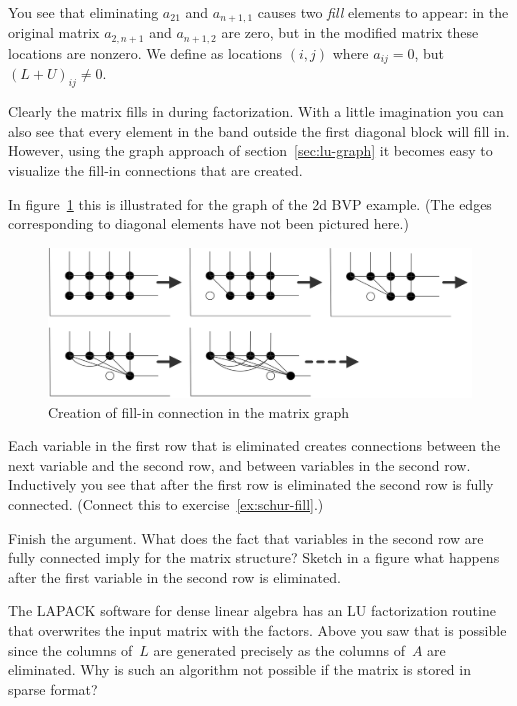 You see that eliminating $a_{21}$ and $a_{n+1,1}$ causes two
\emph{fill} elements to appear: in the original matrix $a_{2,n+1}$ and
$a_{n+1,2}$ are zero, but in the modified matrix these locations
are nonzero.  We define  as
locations $(i,j)$ where $a_{ij}=0$, but~$(L+U)_{ij}\not=0$.

Clearly the matrix fills in during factorization. With a
little imagination you can also see that every element in the band
outside the first diagonal block will fill in. However, using the
graph approach of section~\ref{sec:lu-graph} it becomes easy to
visualize the fill-in connections that are created.

In figure~\ref{fig:row-eliminate} this is illustrated for the 
graph of the 2d \ac{BVP} example. (The edges corresponding to diagonal
elements have not been pictured here.)
\begin{figure}
  \includegraphics[scale=.2]{graphics-public/row-eliminate}
  \caption{Creation of fill-in connection in the matrix graph}
  \label{fig:row-eliminate}
\end{figure}
Each variable in the first row that is eliminated creates connections
between the next variable and the second row, and between variables in
the second row. Inductively you see that after the first row is
eliminated the second row is fully connected. (Connect this to
exercise~\ref{ex:schur-fill}.)

\begin{exercise}
  Finish the argument. What does the fact that variables in the second
  row are fully connected imply for the matrix structure? Sketch in a
  figure what happens after the first variable in the second row is
  eliminated.
\end{exercise}

\begin{exercise}
  The LAPACK software for dense linear algebra has an LU factorization
  routine that overwrites the input matrix with the factors. Above you
  saw that is possible since the columns of~$L$ are generated
  precisely as the columns of~$A$ are eliminated. Why is such an
  algorithm not possible if the matrix is stored in sparse format?
\end{exercise}

